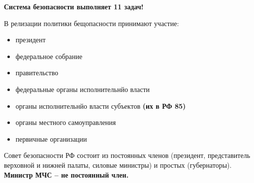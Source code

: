 \documentclass[oneside,final,14pt]{extreport}
\begin{document}
\textbf{Система безопасности выполняет 11 задач!}

В релизации политики бещопасности принимают участие:\begin{itemize}
	\item президент
	\item федеральное собрание
	\item правительство
	\item федеральные органы исполнительнйо власти
	\item органы исполнительнйо власти субъектов \textbf{(их в РФ 85)}
	\item органы местного самоуправления
	\item первичные организации
\end{itemize}

Совет безопасности РФ состоит из постоянных членов (президент, представитель верховной и нижней палаты, силовые министры) и простых (губернаторы). \textbf{Министр МЧС -- не постоянный член.}
\end{document}
